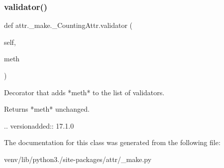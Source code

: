 \subsubsection{\texorpdfstring{validator()}{validator()}}
{\footnotesize\ttfamily def attr.\+\_\+make.\+\_\+\+Counting\+Attr.\+validator (\begin{DoxyParamCaption}\item[{}]{self,  }\item[{}]{meth }\end{DoxyParamCaption})}

\begin{DoxyVerb}Decorator that adds *meth* to the list of validators.

Returns *meth* unchanged.

.. versionadded:: 17.1.0
\end{DoxyVerb}
 

The documentation for this class was generated from the following file\+:\begin{DoxyCompactItemize}
\item 
venv/lib/python3./site-\/packages/attr/\+\_\+make.\+py\end{DoxyCompactItemize}
